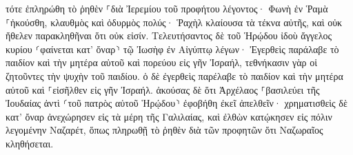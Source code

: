 \documentclass{openreader}
\begin{document}
τότε ἐπληρώθη τὸ ῥηθὲν ⸀διὰ Ἰερεμίου τοῦ προφήτου λέγοντος· 
Φωνὴ ἐν Ῥαμὰ ⸀ἠκούσθη, κλαυθμὸς καὶ ὀδυρμὸς πολύς· Ῥαχὴλ κλαίουσα τὰ τέκνα αὐτῆς, καὶ οὐκ ἤθελεν παρακληθῆναι ὅτι οὐκ εἰσίν. 
Τελευτήσαντος δὲ τοῦ Ἡρῴδου ἰδοὺ ἄγγελος κυρίου ⸂φαίνεται κατ’ ὄναρ⸃ τῷ Ἰωσὴφ ἐν Αἰγύπτῳ 
λέγων· Ἐγερθεὶς παράλαβε τὸ παιδίον καὶ τὴν μητέρα αὐτοῦ καὶ πορεύου εἰς γῆν Ἰσραήλ, τεθνήκασιν γὰρ οἱ ζητοῦντες τὴν ψυχὴν τοῦ παιδίου. 
ὁ δὲ ἐγερθεὶς παρέλαβε τὸ παιδίον καὶ τὴν μητέρα αὐτοῦ καὶ ⸀εἰσῆλθεν εἰς γῆν Ἰσραήλ. 
ἀκούσας δὲ ὅτι Ἀρχέλαος ⸀βασιλεύει τῆς Ἰουδαίας ἀντὶ ⸂τοῦ πατρὸς αὐτοῦ Ἡρῴδου⸃ ἐφοβήθη ἐκεῖ ἀπελθεῖν· χρηματισθεὶς δὲ κατ’ ὄναρ ἀνεχώρησεν εἰς τὰ μέρη τῆς Γαλιλαίας, 
καὶ ἐλθὼν κατῴκησεν εἰς πόλιν λεγομένην Ναζαρέτ, ὅπως πληρωθῇ τὸ ῥηθὲν διὰ τῶν προφητῶν ὅτι Ναζωραῖος κληθήσεται. 
\end{document}
